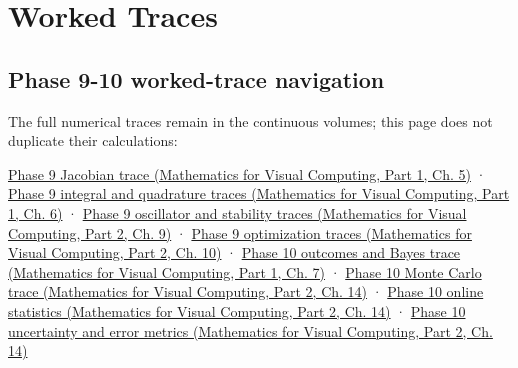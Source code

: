\hypertarget{appendix-92ff77d4dfdc}{}\label{referencestart:appendix-92ff77d4dfdc}
\section{Worked Traces}\label{appendix-92ff77d4dfdc-worked-traces}

\hypertarget{appendix-92ff77d4dfdc-worked-traces}{}

\subsection{Phase 9-10 worked-trace navigation}\label{appendix-92ff77d4dfdc-phase-9-10-worked-trace-navigation}

\hypertarget{appendix-92ff77d4dfdc-phase-9-10-worked-trace-navigation}{}

The full numerical traces remain in the continuous volumes; this page does not duplicate their calculations:

\href{../02-Mathematics-for-Visual-Computing-P01/main.pdf\#02-foundations-ii-ch021-jacobians-curvature-and-local-approximation}{Phase 9 Jacobian trace (Mathematics for Visual Computing, Part 1, Ch. 5)} · \href{../02-Mathematics-for-Visual-Computing-P01/main.pdf\#02-foundations-ii-ch022-integration-and-quadrature}{Phase 9 integral and quadrature traces (Mathematics for Visual Computing, Part 1, Ch. 6)} · \href{../02-Mathematics-for-Visual-Computing-P02/main.pdf\#02-foundations-ii-ch025-odes-and-numerical-simulation}{Phase 9 oscillator and stability traces (Mathematics for Visual Computing, Part 2, Ch. 9)} · \href{../02-Mathematics-for-Visual-Computing-P02/main.pdf\#02-foundations-ii-ch026-optimization-and-inverse-problems}{Phase 9 optimization traces (Mathematics for Visual Computing, Part 2, Ch. 10)} · \href{../02-Mathematics-for-Visual-Computing-P01/main.pdf\#02-foundations-ii-ch023-a-probability-model-begins-with-possible-outcomes}{Phase 10 outcomes and Bayes trace (Mathematics for Visual Computing, Part 1, Ch. 7)} · \href{../02-Mathematics-for-Visual-Computing-P02/main.pdf\#02-foundations-ii-ch030-monte-carlo-estimates-trade-computation-for-uncertainty}{Phase 10 Monte Carlo trace (Mathematics for Visual Computing, Part 2, Ch. 14)} · \href{../02-Mathematics-for-Visual-Computing-P02/main.pdf\#02-foundations-ii-ch030-finite-samples-need-stable-descriptive-statistics}{Phase 10 online statistics (Mathematics for Visual Computing, Part 2, Ch. 14)} · \href{../02-Mathematics-for-Visual-Computing-P02/main.pdf\#02-foundations-ii-ch030-inference-and-error-metrics-need-explicit-assumptions}{Phase 10 uncertainty and error metrics (Mathematics for Visual Computing, Part 2, Ch. 14)}

